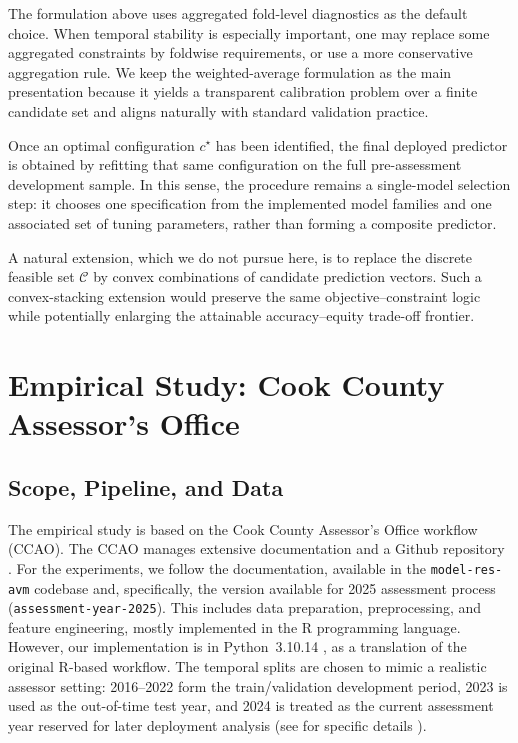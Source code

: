 \documentclass[12pt, draft]{article}
\theoremstyle{plain}
\theoremstyle{definition}
\newcommand{\1}{\mathbf{1}}
\begin{document}
The formulation above uses aggregated fold-level diagnostics as the default choice. When temporal stability is especially important, one may replace some aggregated constraints by foldwise requirements, or use a more conservative aggregation rule. We keep the weighted-average formulation as the main presentation because it yields a transparent calibration problem over a finite candidate set and aligns naturally with standard validation practice.

Once an optimal configuration $c^\star$ has been identified, the final deployed predictor is obtained by refitting that same configuration on the full pre-assessment development sample. In this sense, the procedure remains a single-model selection step: it chooses one specification from the implemented model families and one associated set of tuning parameters, rather than forming a composite predictor.

A natural extension, which we do not pursue here, is to replace the discrete feasible set $\mathcal C$ by convex combinations of candidate prediction vectors. Such a convex-stacking extension would preserve the same objective--constraint logic while potentially enlarging the attainable accuracy--equity trade-off frontier.





\section{Empirical Study: Cook County Assessor's Office}
\label{sec:empirical}

\subsection{Scope, Pipeline, and Data}

The empirical study is based on the Cook County Assessor's Office workflow (CCAO). The CCAO manages extensive documentation and a Github repository . For the experiments, we follow the documentation, available in the \texttt{model-res-avm} codebase and, specifically, the version available for 2025 assessment process (\texttt{assessment-year-2025}). This includes data preparation, preprocessing, and feature engineering, mostly implemented in the R programming language. However, our implementation is in Python~3.10.14 , as a translation of the original R-based workflow. The temporal splits are chosen to mimic a realistic assessor setting: 2016--2022 form the train/validation development period, 2023 is used as the out-of-time test year, and 2024 is treated as the current assessment year reserved for later deployment analysis (see for specific details  ). 
\end{document}
